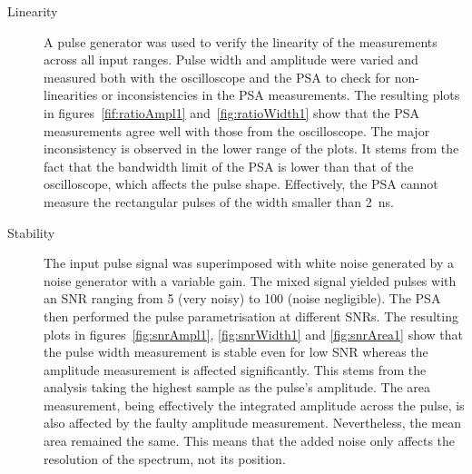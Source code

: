 \begin{description}
\item[Linearity]
A pulse generator was used to verify the linearity of the measurements across all input ranges. Pulse width and amplitude were varied and measured both with the oscilloscope and the PSA to check for non-linearities or inconsistencies in the PSA measurements. The resulting plots in figures~\ref{fif:ratioAmpl1} and~\ref{fig:ratioWidth1} show that the PSA measurements agree well with those from the oscilloscope. The major inconsistency is observed in the lower range of the plots. It stems from the fact that the bandwidth limit of the PSA is lower than that of the oscilloscope, which affects the pulse shape. Effectively, the PSA cannot measure the rectangular pulses of the width smaller than 2~ns.

\item[Stability]
The input pulse signal was superimposed with white noise generated by a noise generator with a variable gain. The mixed signal yielded pulses with an SNR ranging from 5 (very noisy) to 100 (noise negligible). The PSA then performed the pulse parametrisation at different SNRs. The resulting plots in figures~\ref{fig:snrAmpl1}, \ref{fig:snrWidth1} and \ref{fig:snrArea1} show that the pulse width measurement is stable even for low SNR whereas the amplitude measurement is affected significantly. This stems from the analysis taking the highest sample as the pulse's amplitude. The area measurement, being effectively the integrated amplitude across the pulse, is also affected by the faulty amplitude measurement. Nevertheless, the mean area remained the same. This means that the added noise only affects the resolution of the spectrum, not its position.
 \end{description}

